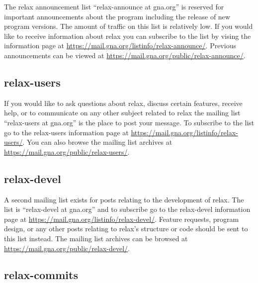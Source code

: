 The relax announcement list ``relax-announce at gna.org'' is reserved for important announcements about the program including the release of new program versions.  The amount of traffic on this list is relatively low.  If you would like to receive information about relax you can subscribe to the list by vising the information page at \href{https://mail.gna.org/listinfo/relax-announce/}{https://mail.gna.org/listinfo/relax-announce/}.  Previous announcements can be viewed at \href{https://mail.gna.org/public/relax-announce/}{https://mail.gna.org/public/relax-announce/}.


\subsection{relax-users}

If you would like to ask questions about relax, discuss certain features, receive help, or to communicate on any other subject related to relax the mailing list ``relax-users at gna.org'' is the place to post your message.  To subscribe to the list go to the relax-users information page at \href{https://mail.gna.org/listinfo/relax-users/}{https://mail.gna.org/listinfo/relax-users/}.  You can also browse the mailing list archives at \href{https://mail.gna.org/public/relax-users/}{https://mail.gna.org/public/relax-users/}.


\subsection{relax-devel}

A second mailing list exists for posts relating to the development of relax.  The list is ``relax-devel at gna.org'' and to subscribe go to the relax-devel information page at \href{https://mail.gna.org/listinfo/relax-devel/}{https://mail.gna.org/listinfo/relax-devel/}.  Feature requests, program design, or any other posts relating to relax's structure or code should be sent to this list instead.  The mailing list archives can be browsed at \href{https://mail.gna.org/public/relax-devel/}{https://mail.gna.org/public/relax-devel/}.


\subsection{relax-commits}

